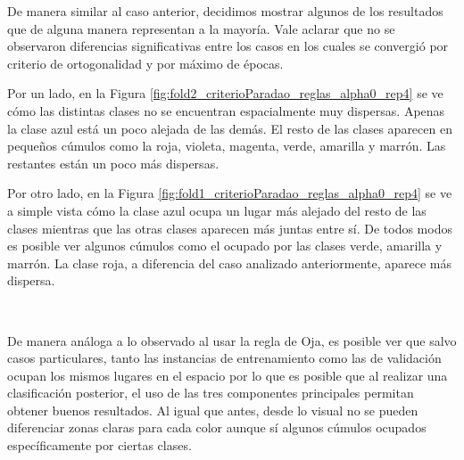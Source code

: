 \documentclass[informe.tex]{subfiles}
\begin{document}
      
      
      
      
	De manera similar al caso anterior, decidimos mostrar algunos de los resultados que de alguna manera representan a la mayoría. Vale aclarar que no se observaron diferencias significativas entre los casos en los cuales se convergió por criterio de ortogonalidad y por máximo de épocas.
	
	Por un lado, en la Figura \ref{fig:fold2_criterioParadao_reglas_alpha0_rep4} se ve cómo las distintas clases no se encuentran espacialmente muy dispersas. Apenas la clase azul está un poco alejada de las demás. El resto de las clases aparecen en pequeños cúmulos como la roja, violeta, magenta, verde, amarilla y marrón. Las restantes están un poco más dispersas.
	
	Por otro lado, en la Figura \ref{fig:fold1_criterioParadao_reglas_alpha0_rep4} se ve a simple vista cómo la clase azul ocupa un lugar más alejado del resto de las clases mientras que las otras clases aparecen más juntas entre sí. De todos modos es posible ver algunos cúmulos como el ocupado por las clases verde, amarilla y marrón. La clase roja, a diferencia del caso analizado anteriormente, aparece más dispersa.
      
	~
	
	De manera análoga a lo observado al usar la regla de Oja, es posible ver que salvo casos particulares, tanto las instancias de entrenamiento como las de validación ocupan los mismos lugares en el espacio por lo que es posible que al realizar una clasificación posterior, el uso de las tres componentes principales permitan obtener buenos resultados. Al igual que antes, desde lo visual no se pueden diferenciar zonas claras para cada color aunque sí algunos cúmulos ocupados específicamente por ciertas clases.
      
\end{document}
